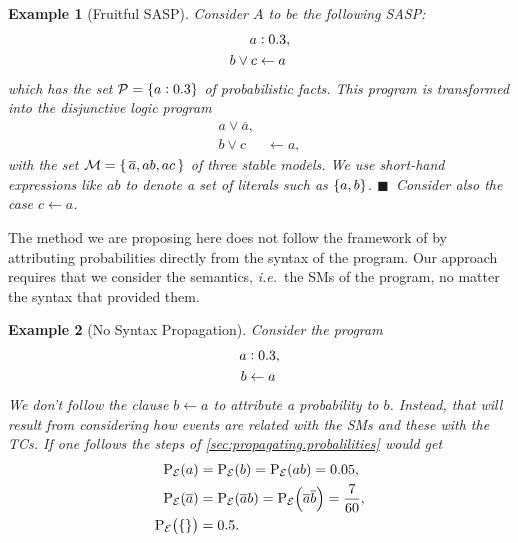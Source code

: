 \documentclass[a4paper]{article}
\renewcommand{\cite}{\citep}
\newtheorem{example}{Example}
\newtheorem{example}{Example}
\newcommand{\at}[1]{\ensuremath{\!\del{#1}}}        %
\newcommand{\cla}[1]{\ensuremath{{\cal #1}}}        %
\newcommand{\clause}{\ensuremath{\leftarrow}}
\newcommand{\co}[1]{\ensuremath{\overline{#1}}}     %
\newcommand{\EVENTSset}{\ensuremath{\cla{E}}}
\newcommand{\prfunc}{\ensuremath{\mathrm{P}}}
\newcommand{\prd}[1]{\ensuremath{\prfunc_{#1}}}
\newcommand{\prE}{\prd{\EVENTSset}}
\newcommand{\probfact}[2]{\ensuremath{#1:#2}}
\newcommand{\LOOK}{\ensuremath{\blacksquare}}
\newcommand{\franc}[1]{{\color{green!30!black}#1}}
\begin{document}
\begin{example}[Fruitful SASP]
  \label{ex:fruitful}\em Consider \(A\) to be the following \ac{SASP}:
  \begin{equation}\label{eq:fruitful}
    \begin{split}
      \probfact{a&}{0.3}, \\
      b \vee c          & \clause a
    \end{split}
  \end{equation}
  which has the set \({\cal P} = \{ a:0.3 \}\) of probabilistic
  facts.  This program is transformed into the disjunctive logic
  program
  \begin{equation}\label{eq:derived.fruitful}
    \begin{split}
      a \vee \co{a},\\
      b \vee c          & \clause a,
    \end{split}
  \end{equation}
  with the set
       \( {\cal M} = \{\, \co{a}, ab, ac\, \} \)
  of three stable models.
  We use short-hand expressions like \(ab\) to denote a set
  of literals such as \(\set{a, b}\).
  \franc{\LOOK~Consider also the case \(c \clause a\).}
\end{example}

The method we are proposing here does not follow the framework of \cite{kifer1992theory} by attributing probabilities directly from the syntax of the program. Our approach requires that we consider the semantics, \emph{i.e.}\ the \aclp{SM} of the program, no matter the syntax that provided them.

\begin{example}[No Syntax Propagation]\label{example:not.syntax.propagation}
    Consider the program
    \begin{equation*}
        \begin{split}
            \probfact{a&}{0.3}, \\
            b & \clause a
        \end{split}
    \end{equation*}
    We don't follow the clause \(b \clause a\) to attribute a probability to \(b\). Instead, that will result from considering how events are related with the \aclp{SM} and these with the \aclp{TC}. If one follows the steps of \cref{sec:propagating.probalilities} would get 
    \begin{equation*}
        \begin{split}
            \prE\at{a} & = \prE\at{b} = \prE\at{ab} = 0.05,\\
            \prE\at{\co{a}} & = \prE\at{\co{a} b} = \prE\at{\co{a}\co{b}} = \frac{7}{60},\\
            \prE\at{\set{}} & = 0.5.\\
        \end{split}
    \end{equation*}
\end{example}
\end{document}
